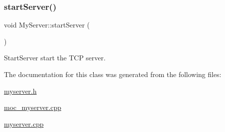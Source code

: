 \mbox{\label{class_my_server_a962f0e205a0aaf08b12d50d1315a8c90}} 
\subsubsection{\texorpdfstring{start\+Server()}{startServer()}}
{\footnotesize\ttfamily void My\+Server\+::start\+Server (\begin{DoxyParamCaption}{ }\end{DoxyParamCaption})}



Start\+Server start the T\+CP server. 



The documentation for this class was generated from the following files\+:\begin{DoxyCompactItemize}
\item 
\mbox{\hyperlink{myserver_8h}{myserver.\+h}}\item 
\mbox{\hyperlink{moc__myserver_8cpp}{moc\+\_\+myserver.\+cpp}}\item 
\mbox{\hyperlink{myserver_8cpp}{myserver.\+cpp}}\end{DoxyCompactItemize}
